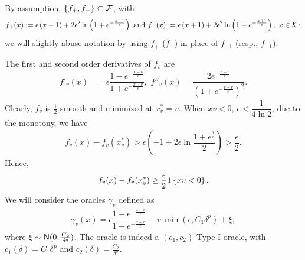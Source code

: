 
By assumption,  $\{f_+, f_-\}\subset \mathcal{F}$, with 
\begin{align*}
f_+(x) :=  \epsilon\left( x-1\right)+2\epsilon^2 \ln\left(1+e^{-\frac{x-1}{\epsilon}}  \right)
\text{ and } f_-(x) := \epsilon\left( x+1\right)+2\epsilon^2 \ln\left(1+e^{-\frac{x+1}{\epsilon}}  \right), \,\, x \in \mathcal{K}\,;
\end{align*}
we will slightly abuse notation by using $f_+$ ($f_-$) in place of $f_{+1}$ (resp., $f_{-1}$).

The first and second order derivatives of $f_v$ are
\begin{align*}
f'_v(x) &=\epsilon \dfrac{1-e^{-\frac{x-v}{\epsilon}}}{1+e^{-\frac{x-v}{\epsilon}}} ,\,\,
f''_v(x) = \dfrac{2e^{-\frac{x-v}{\epsilon}} }{\left(  1+e^{-\frac{x-v}{\epsilon}}\right)^2}  .
\end{align*}
Clearly, $f_v$ is $\frac{1}{2}$-smooth and minimized at $x^*_v = v$.
When $xv<0$, $\epsilon<\dfrac{1}{4\ln 2}$, due to the monotony, we have
\begin{align*}
f_v(x)-f_v(x_v^*) >\epsilon\left( -1 +2\epsilon \ln\dfrac{1+e^{\frac{1}{\epsilon}}}{2}  \right)> \dfrac{\epsilon}{2}.
\end{align*}
Hence,
\begin{align}
  f_v(x) - f_v(x^*_v)
  \ge \dfrac{\epsilon}{2}  \mathbf{1}\left\{x v  < 0\right\}. \label{eq:fv-lb}
\end{align}
We will consider the oracles $\gamma_v$ defined as 
\begin{align}
 \gamma_v(x) = \epsilon \dfrac{1-e^{-\frac{x-v}{\epsilon}}}{1+e^{-\frac{x-v}{\epsilon}}} - v\, \min(\epsilon,C_1 \delta^p) + \xi, \label{eq:main:oracle-1d}
\end{align}
where $\xi \sim \mathsf{N}(0,\frac{C_2}{\delta^q})$.
The oracle is indeed a $(c_1,c_2)$ Type-I oracle, with $c_1(\delta)=C_1\delta^p$ and $c_2(\delta)=\frac{C_2}{\delta^q}$.

